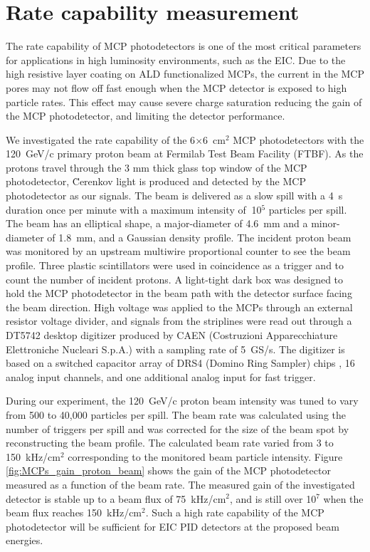 \documentclass[preprint,5p]{elsarticle}
\begin{document}
\section{Rate capability measurement} \label{sec_proton_measurements}
The rate capability of MCP photodetectors is one of the most critical 
parameters for applications in high luminosity environments, such as the EIC.  
Due to the high resistive layer coating on ALD functionalized MCPs, the current 
in the MCP pores may not flow off fast enough when the MCP detector is exposed 
to high particle rates. This effect may cause severe charge saturation reducing 
the gain of the MCP photodetector, and limiting the detector performance. 
 
We investigated the rate capability of the 6$\times$6~cm$^2$ MCP photodetectors 
with the 120~GeV/c primary proton beam at Fermilab Test Beam Facility (FTBF).  
As the protons travel through the 3 mm thick glass top window of the MCP 
photodetector, \u Cerenkov light is produced and detected by the MCP 
photodetector as our signals. The beam is delivered as a slow spill with a 4~s 
duration once per minute with a maximum intensity of $~$10$^5$ particles per 
spill. The beam has an elliptical shape, a major-diameter of 4.6~mm and a 
minor-diameter of 1.8~mm, and a Gaussian density profile. The incident proton 
beam was monitored by an upstream multiwire proportional counter to see the 
beam profile. Three plastic scintillators were used in coincidence as a trigger 
and to count the number of incident protons. A light-tight dark box was 
designed to hold the MCP photodetector in the beam path with the detector 
surface facing the beam direction. High voltage was applied to the MCPs through 
an external resistor voltage divider, and signals from the striplines were read 
out through a DT5742 desktop digitizer \cite{Digitizer} produced by CAEN 
(Costruzioni Apparecchiature Elettroniche Nucleari S.p.A.) with a sampling rate 
of 5~GS/s. The digitizer is based on a switched capacitor array of DRS4 (Domino 
Ring Sampler) chips \cite{DRS}, 16 analog input channels, and one additional 
analog input for fast trigger.

During our experiment, the 120~GeV/c proton beam intensity was tuned to vary 
from 500 to 40,000 particles per spill. The beam rate was calculated using the 
number of triggers per spill and was corrected for the size of the beam spot by 
reconstructing the beam profile. The calculated beam rate varied from 3 to 
150~kHz/cm$^2$ corresponding to the monitored beam particle intensity. Figure 
\ref{fig:MCPs_gain_proton_beam} shows the gain of the MCP photodetector 
measured as a function of the beam rate. The measured gain of the investigated 
detector is stable up to a beam flux of 75~kHz/cm$^2$, and is still over 10$^7$ 
when the beam flux reaches 150~kHz/cm$^2$. Such a high rate capability of the 
MCP photodetector will be sufficient for EIC PID detectors at the proposed beam 
energies.
\end{document}
